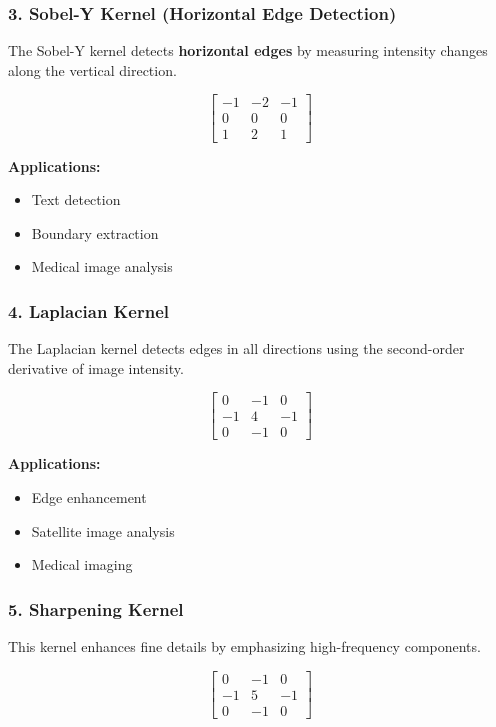 \documentclass[11pt]{article}
\begin{document}
\subsubsection*{3. Sobel-Y Kernel (Horizontal Edge Detection)}

The Sobel-Y kernel detects \textbf{horizontal edges} by measuring
intensity changes along the vertical direction.

\[
\begin{bmatrix}
-1 & -2 & -1\\
0 & 0 & 0\\
1 & 2 & 1
\end{bmatrix}
\]

\textbf{Applications:}
\begin{itemize}
\item Text detection
\item Boundary extraction
\item Medical image analysis
\end{itemize}

\subsubsection*{4. Laplacian Kernel}

The Laplacian kernel detects edges in all directions using the
second-order derivative of image intensity.

\[
\begin{bmatrix}
0 & -1 & 0\\
-1 & 4 & -1\\
0 & -1 & 0
\end{bmatrix}
\]

\textbf{Applications:}
\begin{itemize}
\item Edge enhancement
\item Satellite image analysis
\item Medical imaging
\end{itemize}

\subsubsection*{5. Sharpening Kernel}

This kernel enhances fine details by emphasizing high-frequency
components.

\[
\begin{bmatrix}
0 & -1 & 0\\
-1 & 5 & -1\\
0 & -1 & 0
\end{bmatrix}
\]
\end{document}

